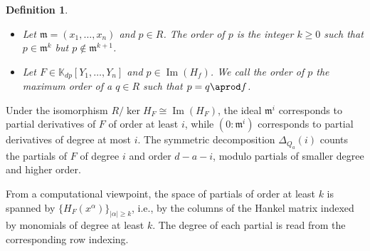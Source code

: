 \documentclass[a4paper,11p]{amsart}
\newcommand{\m}{\mathfrak m}
\newtheorem{defn0}{Definition}[section]
\newenvironment{definition}{ \begin{defn0}}{\end{defn0}}
\newcommand{\K}{\mathbb K}
\begin{document}



\begin{definition}
    \begin{itemize}
        \item \leavevmode Let $\m=(x_1,\ldots, x_n)$ and $p\in R$. The \emph{order} of $p$ is the integer $k\geq 0$ such that $p\in \m^k$ but $p\not \in \m^{k+1}$.
        \item Let $F\in \K_{dp}[Y_1,\ldots, Y_n]$ and $p\in \operatorname{Im}(H_f)$. We call the order of $p$ the maximum order of a $q\in R$ such that $p=q\aprod f$.
    \end{itemize}
     
\end{definition}

Under the isomorphism $R/\ker H_F \cong \operatorname{Im}(H_F)$, the ideal $\m^{i}$ corresponds to partial derivatives of $F$ of order at least $i$, while $(0:\m^{i})$ corresponds to partial derivatives of degree at most $i$. The symmetric decomposition $\Delta_{Q_a}(i)$ counts the partials of $F$ of degree $i$ and order $d-a-i$, modulo partials of smaller degree and higher order.

From a computational viewpoint, the space of partials of order at least $k$ is spanned by $\{H_F(x^\alpha)\}_{|\alpha|\ge k}$, i.e., by the columns of the Hankel matrix indexed by monomials of degree at least $k$. The degree of each partial is read from the corresponding row indexing.

\end{document}
